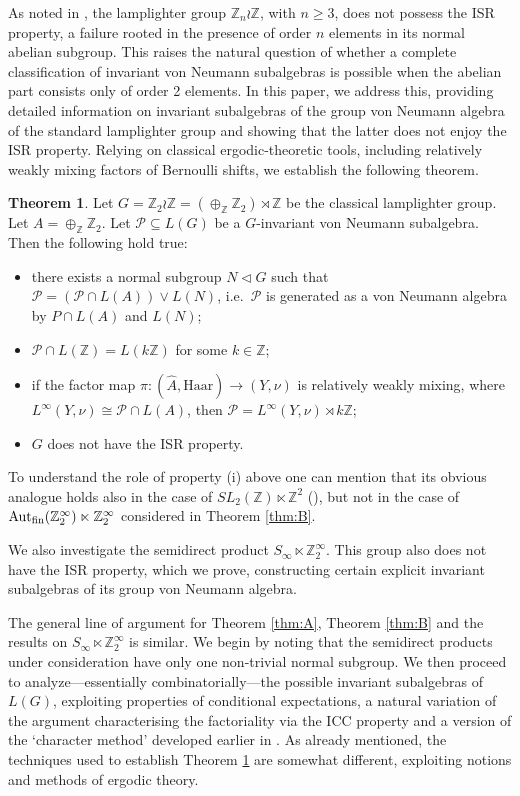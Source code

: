 \documentclass[11pt]{amsart}
\newcommand{\Z}{\mathbb Z}
\newcommand{\Aut}{\textup{Aut}}
\theoremstyle{plain}
\theoremstyle{definition}
\newtheorem{thmx}{Theorem}
\theoremstyle{remark}
\numberwithin{equation}{section}
\begin{document}
As noted in \cite[Example~3.5]{amrutam2023invariant}, the lamplighter group $\Z_n\wr\Z$, with $n\ge 3$, does not possess the ISR property, a failure rooted in the presence of order $n$ elements in its normal abelian subgroup. This raises the natural question of whether a complete classification of invariant von Neumann subalgebras is possible when the abelian part consists only of order 2 elements. In this paper, we address this,  providing detailed information on invariant subalgebras of the group von Neumann algebra of the standard lamplighter group and showing that the latter does not enjoy the ISR property. Relying on classical ergodic-theoretic tools, including relatively weakly mixing factors of Bernoulli shifts, we establish the following theorem.
\begin{thmx} \label{thm:C}
Let $G=\mathbb{Z}_2\wr\mathbb{Z}=(\oplus_{\mathbb{Z}}\mathbb{Z}_2)\rtimes \mathbb{Z}$ be the classical lamplighter group. Let $A=\oplus_{\mathbb{Z}}\mathbb{Z}_2$.
Let $\mathcal{P}\subseteq L(G)$ be a $G$-invariant von Neumann subalgebra. Then the following hold true:
\begin{itemize}
\item[(i)] there exists a normal subgroup $N\lhd G$ such that $\mathcal{P}=(\mathcal{P}\cap L(A))\vee L(N)$, i.e.\ $\mathcal{P}$ is generated as a von Neumann algebra by $P\cap L(A)$ and $L(N)$; 
\item[(ii)] $\mathcal{P}\cap L(\mathbb{Z})=L(k\mathbb{Z})$ for some $k\in\mathbb{Z}$;
\item[(iii)] if the factor map $\pi: (\widehat{A},\text{Haar})\rightarrow (Y,\nu)$ is relatively weakly mixing, where $L^{\infty}(Y,\nu)\cong \mathcal{P}\cap L(A)$, then $\mathcal{P}=L^{\infty}(Y,\nu)\rtimes k\mathbb{Z}$;
\item[(iv)] $G$ does not have the ISR property.
\end{itemize}
	\end{thmx}
To understand the role of property (i) above one can mention that its obvious analogue holds also in the case of $SL_2(\Z) \ltimes \Z^2$	(\cite{JiangLiu}), but not in the case of $\Aut_{\textup{fin}}(\Z_2^\infty) \ltimes \Z_2^\infty$ considered in Theorem \ref{thm:B}.
	
	
We also investigate the  semidirect product \( S_\infty \ltimes \mathbb{Z}_2^\infty \). This group also does not have the ISR property, which we prove, constructing certain explicit  invariant subalgebras of its group von Neumann algebra.

The general line of argument for Theorem \ref{thm:A}, Theorem \ref{thm:B} and the results on \( S_\infty \ltimes \mathbb{Z}_2^\infty \) is similar. We begin by noting that the semidirect products under consideration have only one non-trivial normal subgroup. We then proceed to analyze---essentially combinatorially---the possible invariant subalgebras of \( L(G) \), exploiting properties of conditional expectations, a natural variation of the argument characterising the factoriality via the ICC property and a version of the `character method' developed earlier in \cite{dudko2024character}.
As already mentioned, the techniques used to establish Theorem \ref{thm:C} are somewhat different, exploiting notions and methods of ergodic theory.
\end{document}
